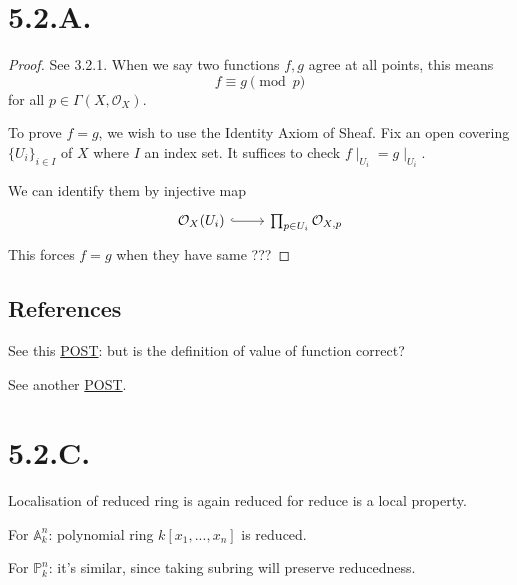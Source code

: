 \section{5.2.A.}

\begin{proof}
    
See 3.2.1. When we say two functions $f,g$ agree at all points, this means 
\[f\equiv g\pmod{p}\] for all $p\in \Gamma(X,\mathcal O_X)$.    

To prove $f=g$, we wish to use the Identity Axiom of Sheaf. Fix an open covering $\{U_i\}_{i\in I}$ of $X$ where $I$ an index set. It suffices to check $f\mid_{U_i}=g\mid_{U_i}$.

We can identify them by injective map 
\[\begin{tikzcd}
	{\mathcal O_X(U_i)} & {\prod_{p\in U_i}\mathcal O_{X,p}}
	\arrow[hook, from=1-1, to=1-2]
\end{tikzcd}\]
This forces $f=g$ when they have same ???

\end{proof}

\subsection{References}

See this \href{https://math.stackexchange.com/questions/3834821/equality-of-functions-in-a-reduced-scheme}{POST}: but is the definition of value of function correct?

See another \href{https://math.stackexchange.com/questions/1157904/functions-on-reduced-schemes-are-determined-by-their-values-at-each-point}{POST}.

\section{5.2.C.}

Localisation of reduced ring is again reduced for reduce is a local property. 

For $\mathbb A^n_k$: 
polynomial ring $k[x_1,...,x_n]$ is reduced.

For $\mathbb P^n_k$: it's similar, since taking subring will preserve reducedness.